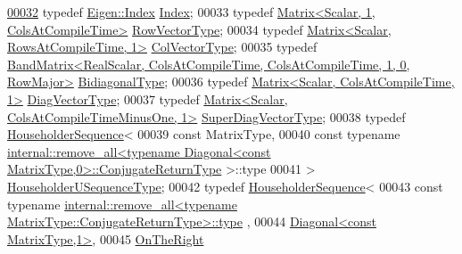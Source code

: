\begin{DoxyCode}
\hyperlink{class_eigen_1_1internal_1_1_upper_bidiagonalization_adcb14f3919a3dcc9977ba6b8105087fe}{00032}     \textcolor{keyword}{typedef} \hyperlink{namespace_eigen_a62e77e0933482dafde8fe197d9a2cfde}{Eigen::Index} \hyperlink{class_eigen_1_1internal_1_1_upper_bidiagonalization_adcb14f3919a3dcc9977ba6b8105087fe}{Index}; 
00033     \textcolor{keyword}{typedef} \hyperlink{group___core___module_class_eigen_1_1_matrix}{Matrix<Scalar, 1, ColsAtCompileTime>} 
      \hyperlink{group___core___module_class_eigen_1_1_matrix}{RowVectorType};
00034     \textcolor{keyword}{typedef} \hyperlink{group___core___module_class_eigen_1_1_matrix}{Matrix<Scalar, RowsAtCompileTime, 1>} 
      \hyperlink{group___core___module_class_eigen_1_1_matrix}{ColVectorType};
00035     \textcolor{keyword}{typedef} 
      \hyperlink{group___core___module}{BandMatrix<RealScalar, ColsAtCompileTime, ColsAtCompileTime, 1, 0, RowMajor>}
       \hyperlink{group___core___module}{BidiagonalType};
00036     \textcolor{keyword}{typedef} \hyperlink{group___core___module_class_eigen_1_1_matrix}{Matrix<Scalar, ColsAtCompileTime, 1>} 
      \hyperlink{group___core___module_class_eigen_1_1_matrix}{DiagVectorType};
00037     \textcolor{keyword}{typedef} \hyperlink{group___core___module_class_eigen_1_1_matrix}{Matrix<Scalar, ColsAtCompileTimeMinusOne, 1>} 
      \hyperlink{group___core___module_class_eigen_1_1_matrix}{SuperDiagVectorType};
00038     \textcolor{keyword}{typedef} \hyperlink{group___householder___module_class_eigen_1_1_householder_sequence}{HouseholderSequence}<
00039               \textcolor{keyword}{const} MatrixType,
00040               \textcolor{keyword}{const} \textcolor{keyword}{typename} 
      \hyperlink{struct_eigen_1_1internal_1_1remove__all}{internal::remove\_all<typename Diagonal<const MatrixType,0>::ConjugateReturnType}
      >::type
00041             > \hyperlink{group___householder___module_class_eigen_1_1_householder_sequence}{HouseholderUSequenceType};
00042     \textcolor{keyword}{typedef} \hyperlink{group___householder___module_class_eigen_1_1_householder_sequence}{HouseholderSequence}<
00043               \textcolor{keyword}{const} \textcolor{keyword}{typename} 
      \hyperlink{group___sparse_core___module}{internal::remove\_all<typename MatrixType::ConjugateReturnType>::type}
      ,
00044               \hyperlink{group___core___module_class_eigen_1_1_diagonal}{Diagonal<const MatrixType,1>},
00045               \hyperlink{group__enums_ggac22de43beeac7a78b384f99bed5cee0ba99dc75d8e00b6c3a5bdc31940f47492b}{OnTheRight}

\end{DoxyCode}
